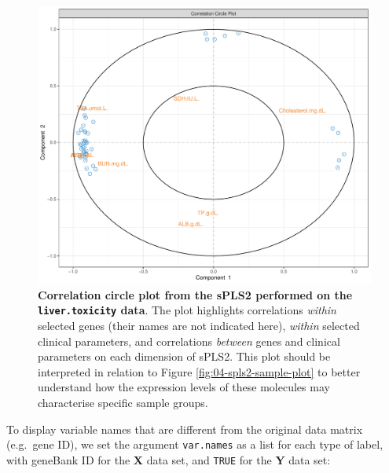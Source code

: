 \documentclass[
]{book}
\newenvironment{Shaded}{\begin{snugshade}}{\end{snugshade}}
\newcommand{\AttributeTok}[1]{\textcolor[rgb]{0.77,0.63,0.00}{#1}}
\newcommand{\ConstantTok}[1]{\textcolor[rgb]{0.00,0.00,0.00}{#1}}
\newcommand{\DecValTok}[1]{\textcolor[rgb]{0.00,0.00,0.81}{#1}}
\newcommand{\FunctionTok}[1]{\textcolor[rgb]{0.00,0.00,0.00}{#1}}
\newcommand{\NormalTok}[1]{#1}
\newcommand{\SpecialCharTok}[1]{\textcolor[rgb]{0.00,0.00,0.00}{#1}}
\newcommand{\StringTok}[1]{\textcolor[rgb]{0.31,0.60,0.02}{#1}}
\begin{document}
\begin{figure}

{\centering \includegraphics[width=0.7\linewidth]{Figures/PLS/04-spls2-variable-plot-1} 

}

\caption{\textbf{Correlation circle plot from the sPLS2 performed on the \texttt{liver.toxicity} data}. The plot highlights correlations \emph{within} selected genes (their names are not indicated here), \emph{within} selected clinical parameters, and correlations \emph{between} genes and clinical parameters on each dimension of sPLS2. This plot should be interpreted in relation to Figure \ref{fig:04-spls2-sample-plot} to better understand how the expression levels of these molecules may characterise specific sample groups.}\label{fig:04-spls2-variable-plot}
\end{figure}



To display variable names that are different from the original data matrix (e.g.~gene ID), we set the argument \texttt{var.names} as a list for each type of label, with geneBank ID for the \(\boldsymbol X\) data set, and \texttt{TRUE} for the \(\boldsymbol Y\) data set:

\begin{Shaded}
\end{Shaded}
\end{document}
